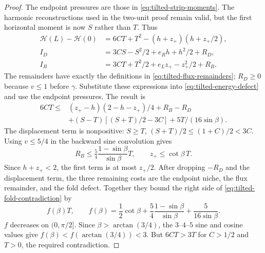 \begin{proof}
The endpoint pressures are those in
\cref{eq:tilted-strip-moments}. The harmonic reconstructions
used in the two-unit proof remain valid, but the first horizontal
moment is now $S$ rather than $T$. Thus
\[
 \begin{split}
 \mathcal H(L)-\mathcal H(0)&=6CT+T^2-(h+z_+)(h+z_+/2),\\
 I_D&=3CS-S^2/2+e_Rh+h^2/2+R_D,\\
 I_B&=3CT+T^2/2+e_Lz_+-z_+^2/2+R_B.
 \end{split}
\]
The remainders have exactly the definitions in
\cref{eq:tilted-flux-remainders}; $R_D\ge0$ because
$v\le1$ before $\gamma$. Substitute these expressions into
\cref{eq:tilted-energy-defect} and use the endpoint pressures.
The result is
\begin{equation}\label{eq:tilted-fold-contradiction}
 \begin{split}
 6CT\le{}&(z_+-h)(2-h-z_+)/4+R_B-R_D\\
 &+(S-T)[(S+T)/2-3C]+5T/(16\sin\beta).
 \end{split}
\end{equation}
The displacement term is nonpositive:
$S\ge T$, $(S+T)/2\le(1+C)/2<3C$.
Using $v\le5/4$ in the backward sine convolution gives
\[
 R_B\le\tfrac54\frac{1-\sin\beta}{\sin\beta}T,
 \qquad z_+\le\cot\beta\,T.
\]
Since $h+z_+<2$, the first term is at most $z_+/2$.
After dropping $-R_D$ and the displacement term, the three remaining
costs are the endpoint niche, the flux remainder, and the fold defect.
Together they bound the right side of
\cref{eq:tilted-fold-contradiction} by
\[
 f(\beta)T,\qquad
 f(\beta)=\frac12\cot\beta
          +\frac54\frac{1-\sin\beta}{\sin\beta}
          +\frac5{16\sin\beta}.
\]
$f$ decreases on $(0,\pi/2]$. Since $\beta>\arctan(3/4)$,
the $3$--$4$--$5$ sine and cosine values give
$f(\beta)<f(\arctan(3/4))<3$.
But $6CT>3T$ for $C>1/2$ and $T>0$, the required contradiction.
\end{proof}
